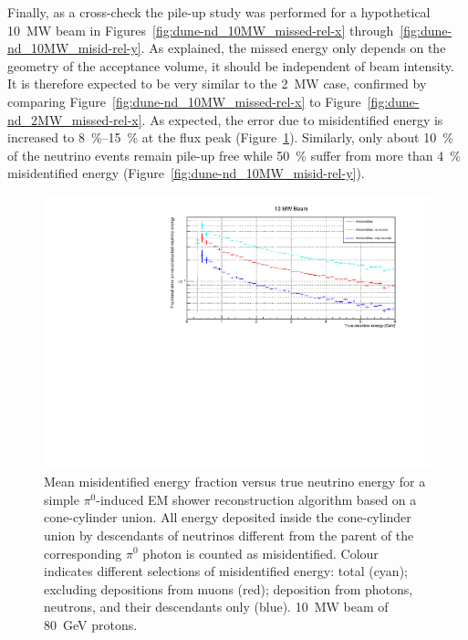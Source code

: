 \documentclass[a4paper]{article}
\begin{document}
Finally, as a cross-check the pile-up study was performed for a hypothetical \SI{10}{\mega\watt} beam in Figures~\ref{fig:dune-nd_10MW_missed-rel-x} through~\ref{fig:dune-nd_10MW_misid-rel-y}.
As explained, the missed energy only depends on the geometry of the acceptance volume, it should be independent of beam intensity.
It is therefore expected to be very similar to the \SI{2}{\mega\watt} case, confirmed by comparing Figure~\ref{fig:dune-nd_10MW_missed-rel-x} to Figure~\ref{fig:dune-nd_2MW_missed-rel-x}.
As expected, the error due to misidentified energy is increased to \SIrange{8}{15}{\percent} at the flux peak (Figure~\ref{fig:dune-nd_10MW_misid-rel-x}).
Similarly, only about \SI{10}{\percent} of the neutrino events remain pile-up free while \SI{50}{\percent} suffer from more than \SI{4}{\percent} misidentified energy (Figure~\ref{fig:dune-nd_10MW_misid-rel-y}).

\begin{figure}[tbp]
	\centering
	\includegraphics[width=\textwidth]{Figures/10MW/misid_rel_x}
	\caption[Pile-up study mean misidentified fractional vs.\ true neutrino energy, \SI{10}{\mega\watt} beam]{%
		Mean misidentified energy fraction versus true neutrino energy for a simple $\pi^0$-induced EM shower reconstruction algorithm based on a cone-cylinder union.
		All energy deposited inside the cone-cylinder union by descendants of neutrinos different from the parent of the corresponding $\pi^0$ photon is counted as misidentified.
		Colour indicates different selections of misidentified energy: total (cyan); excluding depositions from muons (red); deposition from photons, neutrons, and their descendants only (blue).
		\SI{10}{\mega\watt} beam of \SI{80}{\giga\electronvolt} protons.
	}
	\label{fig:dune-nd_10MW_misid-rel-x}
\end{figure}
\end{document}
